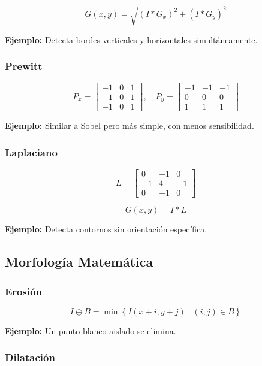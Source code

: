 \documentclass[12pt]{article}
\begin{document}
\[
G(x,y) = \sqrt{(I * G_x)^2 + (I * G_y)^2}
\]

\textbf{Ejemplo:}  
Detecta bordes verticales y horizontales simultáneamente.

\subsubsection{Prewitt}

\[
P_x =
\begin{bmatrix}
-1 & 0 & 1\\
-1 & 0 & 1\\
-1 & 0 & 1
\end{bmatrix}, \quad
P_y =
\begin{bmatrix}
-1 & -1 & -1\\
0 & 0 & 0\\
1 & 1 & 1
\end{bmatrix}
\]

\textbf{Ejemplo:}  
Similar a Sobel pero más simple, con menos sensibilidad.

\subsubsection{Laplaciano}

\[
L =
\begin{bmatrix}
0 & -1 & 0\\
-1 & 4 & -1\\
0 & -1 & 0
\end{bmatrix}
\]

\[
G(x,y) = I * L
\]

\textbf{Ejemplo:}  
Detecta contornos sin orientación específica.

\subsection{Morfología Matemática}

\subsubsection{Erosión}

\[
I \ominus B = \min \left\{ I(x+i, y+j) \mid (i,j) \in B \right\}
\]

\textbf{Ejemplo:}  
Un punto blanco aislado se elimina.

\subsubsection{Dilatación}
\end{document}
